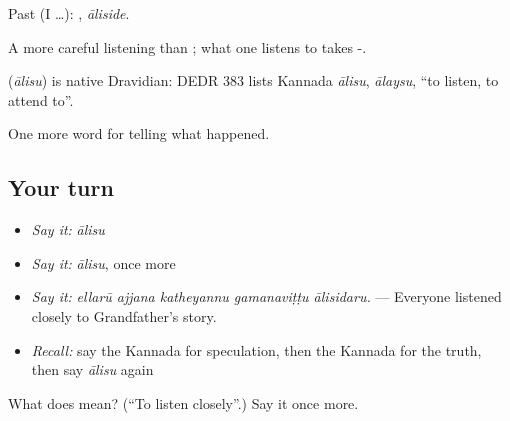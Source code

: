 Past (I …): , \emph{āliside}.

A more careful listening than ; what one listens to takes -.

\begin{cousinweb}
\textbf{} (\emph{ālisu}) is native Dravidian: DEDR 383 lists Kannada \emph{ālisu}, \emph{ālaysu}, \textquotedblleft{}to listen, to attend to\textquotedblright{}.
\end{cousinweb}

\begin{grammarlens}[title={What you've built}]
One more word for telling what happened.
\end{grammarlens}

\subsection*{Your turn}
\begin{itemize}
\raggedright
  \item \emph{Say it:} \emph{ālisu}
  \item \emph{Say it:} \emph{ālisu}, once more
  \item \emph{Say it:} \emph{ellarū ajjana katheyannu gamanaviṭṭu ālisidaru.} — Everyone listened closely to Grandfather's story.
  \item \emph{Recall:} say the Kannada for speculation, then the Kannada for the truth, then say \emph{ālisu} again
\end{itemize}

\begin{tcolorbox}[breakable,colback=teal!4,colframe=teal!35!black,title={Before you move on}]
What does  mean? (\textquotedblleft{}To listen closely\textquotedblright{}.) Say it once more.
\end{tcolorbox}
